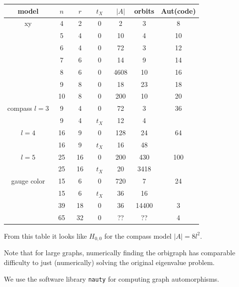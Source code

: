 \documentclass[12pt]{article}
\begin{document}
\begin{center}
\begin{tabular}{ c|c|c|c|c|c|c } 
model &\ $n$\ &\ $r$\ &\ $t_X$\ & $|A|$ & orbits & Aut(code) \\
\hline
    xy & 4 &  2& 0 & 2 & 3 & 8 \\
       & 5 &  4& 0 & 10 & 4 & 10 \\
       & 6 &  4& 0 & 72 & 3 & 12 \\
       & 7 &  6& 0 & 14 & 9 & 14 \\
       & 8 &  6& 0 & 4608 & 10 & 16 \\
       & 9 &  8& 0 & 18 & 23 & 18  \\
       & 10 & 8& 0 & 200 & 10 & 20  \\
\hline
    compass $l=3$ & 9 & 4 & 0 & 72 & 3 & 36 \\
                  & 9 & 4 & $t_X$ & 12 & 4 &  \\
            $l=4$  & 16 & 9  & 0 & 128 & 24 & 64 \\
                   & 16 & 9  & $t_X$ & 16 & 48 &  \\
            $l=5$  & 25 & 16 & 0 & 200 & 430 & 100 \\
                   & 25 & 16 & $t_X$ & 20  & 3418 &  \\
\hline
    gauge color & 15 & 6  & 0 & 720 & 7 & 24  \\
                & 15 & 6  & $t_X$ & 36 & 16 &  \\
                & 39 & 18 & 0 & 36 & 14400 & 3  \\
                & 65 & 32 & 0 & ?? & ?? & 4 \\
\end{tabular}
\end{center}

From this table it looks like $H_{0,0}$ for the compass model $|A| = 8l^2.$

Note that for large graphs, numerically finding the orbigraph has comparable
difficulty to just (numerically) solving the original eigenvalue problem.

We use the software library {\tt nauty}\cite{McKay2014} for computing graph automorphisms.


%
%
\end{document}
